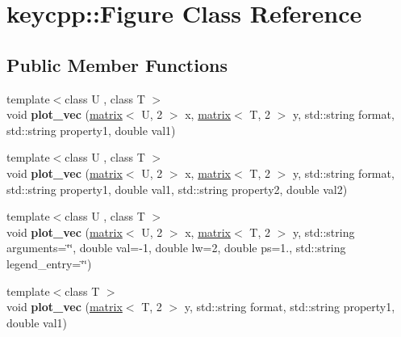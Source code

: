 \hypertarget{classkeycpp_1_1_figure}{\section{keycpp\-:\-:Figure Class Reference}
\label{classkeycpp_1_1_figure}
}
\subsection*{Public Member Functions}
\begin{DoxyCompactItemize}
\item 
\hypertarget{classkeycpp_1_1_figure_a3330946df815ec98cd8b836027636326}{{\footnotesize template$<$class U , class T $>$ }\\void {\bfseries plot\-\_\-vec} (\hyperlink{classkeycpp_1_1matrix}{matrix}$<$ U, 2 $>$ x, \hyperlink{classkeycpp_1_1matrix}{matrix}$<$ T, 2 $>$ y, std\-::string format, std\-::string property1, double val1)}\label{classkeycpp_1_1_figure_a3330946df815ec98cd8b836027636326}

\item 
\hypertarget{classkeycpp_1_1_figure_aa09a1cb9602510af21ad7d273f9354eb}{{\footnotesize template$<$class U , class T $>$ }\\void {\bfseries plot\-\_\-vec} (\hyperlink{classkeycpp_1_1matrix}{matrix}$<$ U, 2 $>$ x, \hyperlink{classkeycpp_1_1matrix}{matrix}$<$ T, 2 $>$ y, std\-::string format, std\-::string property1, double val1, std\-::string property2, double val2)}\label{classkeycpp_1_1_figure_aa09a1cb9602510af21ad7d273f9354eb}

\item 
\hypertarget{classkeycpp_1_1_figure_a67022d6aa7a9eb7fb3f17f16f0ceb366}{{\footnotesize template$<$class U , class T $>$ }\\void {\bfseries plot\-\_\-vec} (\hyperlink{classkeycpp_1_1matrix}{matrix}$<$ U, 2 $>$ x, \hyperlink{classkeycpp_1_1matrix}{matrix}$<$ T, 2 $>$ y, std\-::string arguments=\char`\"{}\char`\"{}, double val=-\/1, double lw=2, double ps=1., std\-::string legend\-\_\-entry=\char`\"{}\char`\"{})}\label{classkeycpp_1_1_figure_a67022d6aa7a9eb7fb3f17f16f0ceb366}

\item 
\hypertarget{classkeycpp_1_1_figure_a039afd977f38396fb25074258f5463cf}{{\footnotesize template$<$class T $>$ }\\void {\bfseries plot\-\_\-vec} (\hyperlink{classkeycpp_1_1matrix}{matrix}$<$ T, 2 $>$ y, std\-::string format, std\-::string property1, double val1)}\label{classkeycpp_1_1_figure_a039afd977f38396fb25074258f5463cf}


\end{DoxyCompactItemize}
